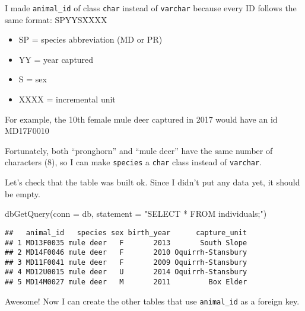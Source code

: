 \documentclass[
]{book}
\newenvironment{Shaded}{\begin{snugshade}}{\end{snugshade}}
\newcommand{\AttributeTok}[1]{\textcolor[rgb]{0.77,0.63,0.00}{#1}}
\newcommand{\FunctionTok}[1]{\textcolor[rgb]{0.00,0.00,0.00}{#1}}
\newcommand{\NormalTok}[1]{#1}
\newcommand{\StringTok}[1]{\textcolor[rgb]{0.31,0.60,0.02}{#1}}
\providecommand{\tightlist}{%
  \setlength{\itemsep}{0pt}\setlength{\parskip}{0pt}}
\begin{document}
I made \texttt{animal\_id} of class \texttt{char} instead of \texttt{varchar} because every ID follows the same format: SPYYSXXXX

\begin{itemize}
\tightlist
\item
  SP = species abbreviation (MD or PR)
\item
  YY = year captured
\item
  S = sex
\item
  XXXX = incremental unit
\end{itemize}

For example, the 10th female mule deer captured in 2017 would have an id MD17F0010

Fortunately, both ``pronghorn'' and ``mule deer'' have the same number of characters (8), so I can make \texttt{species} a \texttt{char} class instead of \texttt{varchar}.

Let's check that the table was built ok. Since I didn't put any data yet, it should be empty.

\begin{Shaded}
\begin{Highlighting}[]
\FunctionTok{dbGetQuery}\NormalTok{(}\AttributeTok{conn =}\NormalTok{ db, }\AttributeTok{statement =} \StringTok{"SELECT * FROM individuals;"}\NormalTok{)}
\end{Highlighting}
\end{Shaded}

\begin{verbatim}
##   animal_id   species sex birth_year      capture_unit
## 1 MD13F0035 mule deer   F       2013       South Slope
## 2 MD14F0046 mule deer   F       2010 Oquirrh-Stansbury
## 3 MD11F0041 mule deer   F       2009 Oquirrh-Stansbury
## 4 MD12U0015 mule deer   U       2014 Oquirrh-Stansbury
## 5 MD14M0027 mule deer   M       2011         Box Elder
\end{verbatim}

Awesome! Now I can create the other tables that use \texttt{animal\_id} as a foreign key.
\end{document}
